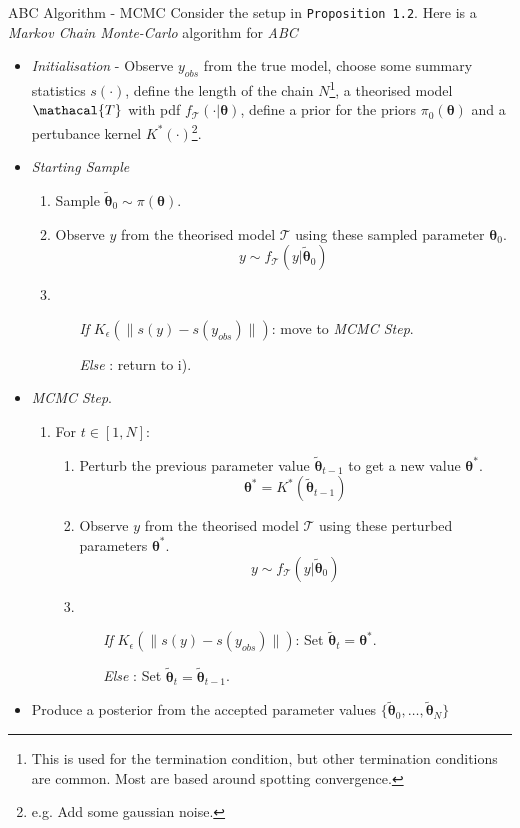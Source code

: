 \documentclass[11pt,a4paper]{article}
\begin{document}
  \begin{proposition}{ABC Algorithm - MCMC\cite{ABC_MCMC_Intro}}
    Consider the setup in \texttt{Proposition 1.2}. Here is a \textit{Markov Chain Monte-Carlo} algorithm for \textit{ABC}
    \begin{itemize}
      \item \textit{Initialisation} - Observe $y_{obs}$ from the true model, choose some summary statistics $s(\cdot)$, define the length of the chain $N$\footnote{This is used for the termination condition, but other termination conditions are common. Most are based around spotting convergence.}, a theorised model $\mathacal{T}$ with pdf $f_\mathcal{T}(\cdot|\pmb\theta)$, define a prior for the priors $\pi_0(\pmb\theta)$ and a pertubance kernel $K^*(\cdot)$\footnote{e.g. Add some gaussian noise.}.
      \item \textit{Starting Sample}
      \begin{enumerate}
        \item Sample $\tilde{\pmb\theta}_0\sim\pi(\pmb\theta)$.
        \item Observe $y$ from the theorised model $\mathcal{T}$ using these sampled parameter $\pmb\theta_0$.
        \[ y\sim f_\mathcal{T}(y|\tilde{\pmb\theta}_0) \]
        \item
        \begin{itemize}
          \item[\textit{If}]$K_{\epsilon}(\|s(y)-s(y_{obs})\|)$: move to \textit{MCMC Step}.
          \item[\textit{Else}]: return to i).
        \end{itemize}
      \end{enumerate}
      \item \textit{MCMC Step}.
      \begin{enumerate}
        \item For $t\in[1,N]:$
        \begin{enumerate}
          \item Perturb the previous parameter value $\tilde{\pmb\theta}_{t-1}$ to get a new value $\pmb\theta^*$.
          \[ \pmb\theta^*=K^*(\tilde{\pmb\theta}_{t-1}) \]
          \item Observe $y$ from the theorised model $\mathcal{T}$ using these perturbed parameters $\pmb\theta^*$.
          \[ y\sim f_\mathcal{T}(y|\tilde{\pmb\theta}_0) \]
          \item
          \begin{itemize}
            \item[\textit{If}]$K_{\epsilon}(\|s(y)-s(y_{obs})\|)$: Set $\tilde{\pmb\theta}_t=\pmb\theta^*$.
            \item[\textit{Else}]: Set $\tilde{\pmb\theta}_t=\tilde{\pmb\theta}_{t-1}$.
          \end{itemize}
        \end{enumerate}
      \end{enumerate}
      \item Produce a posterior from the accepted parameter values $\{\tilde{\pmb\theta}_0,\dots,\tilde{\pmb\theta}_N\}$
    \end{itemize}
  \end{proposition}
\end{document}
